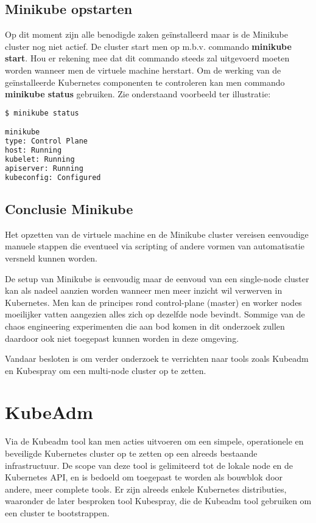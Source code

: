 \subsection{Minikube opstarten}

Op dit moment zijn alle benodigde zaken geïnstalleerd maar is de Minikube cluster nog niet actief. De cluster start men op m.b.v. commando {\bf minikube start}. Hou er rekening mee dat dit commando steeds zal uitgevoerd moeten worden wanneer men de virtuele machine herstart.
Om de werking van de geïnstalleerde Kubernetes componenten te controleren kan men commando {\bf minikube status} gebruiken. Zie onderstaand voorbeeld ter illustratie: 
\begin{lstlisting}[language=bash]
$ minikube status

minikube
type: Control Plane
host: Running
kubelet: Running
apiserver: Running
kubeconfig: Configured
\end{lstlisting} 

\subsection{Conclusie Minikube}

Het opzetten van de virtuele machine en de Minikube cluster vereisen eenvoudige manuele stappen die eventueel via scripting of andere vormen van automatisatie versneld kunnen worden.

De setup van Minikube is eenvoudig maar de eenvoud van een single-node cluster kan als nadeel aanzien worden wanneer men meer inzicht wil verwerven in Kubernetes. Men kan de principes rond control-plane (master) en worker nodes moeilijker vatten aangezien alles zich op dezelfde node bevindt. Sommige van de chaos engineering experimenten die aan bod komen in dit onderzoek zullen daardoor ook niet toegepast kunnen worden in deze omgeving.

Vandaar besloten is om verder onderzoek te verrichten naar tools zoals Kubeadm en Kubespray om een multi-node cluster op te zetten.    

\section{KubeAdm}
\label{sec:kubeadm}

Via de Kubeadm tool kan men acties uitvoeren om een simpele, operationele en beveiligde Kubernetes cluster op te zetten op een alreeds bestaande infrastructuur. De scope van deze tool is gelimiteerd tot de lokale node en de Kubernetes API, en is bedoeld om toegepast te worden als bouwblok door andere, meer complete tools. \autocite{Kubeadm2021}
Er zijn alreeds enkele Kubernetes distributies, waaronder de later besproken tool Kubespray, die de Kubeadm tool gebruiken om een cluster te bootstrappen.     

